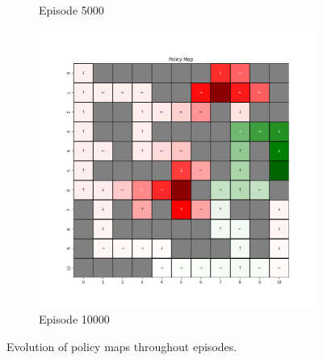 \documentclass{assignment}
\begin{document}
\begin{figure}[H]
\begin{subfigure}{0.3\textwidth}
    \caption{Episode 5000}
    \end{subfigure}\hfill
    \begin{subfigure}{0.3\textwidth}
        \includegraphics[width=\textwidth]{figures/policy_td/epsilon_sweep/policy_alpha_0.1_gamma_0.95_epsilon_0.5_iteration_10000.png}
    \caption{Episode 10000}
    \end{subfigure}
    \caption{Evolution of policy maps throughout episodes.}
    \label{fig:epsilon_0.5_td_learning_policy}
\end{figure}
\end{document}
